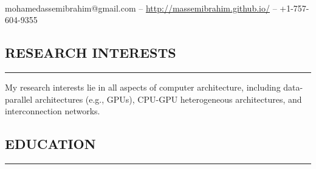 \documentclass[10pt,a4]{article}
\begin{document}
\thispagestyle{empty}

\pagestyle{fancy}
\fancyhf{}
\cfoot{{\thepage}}
\renewcommand{\headrulewidth}{0pt}
\renewcommand{\footrulewidth}{0pt}
\long{}
\sloppypar


\begin{center}
\hspace{-0.4in}{\huge \bf Mohamed Assem Ibrahim} \\
\vspace*{0.5cm}
mohamedassemibrahim@gmail.com -- \url{http://massemibrahim.github.io/} -- +1-757-604-9355
\end{center}


\subsection*{RESEARCH INTERESTS}
\hrule
\vspace{0.2cm}
\begin{list}{}{}
\item 
My research interests lie in all aspects of computer architecture, including data-parallel architectures (e.g., GPUs), CPU-GPU heterogeneous architectures, and interconnection networks.
\end{list}

\subsection*{EDUCATION}

\hrule
\vspace{0.2cm}
\end{document}
